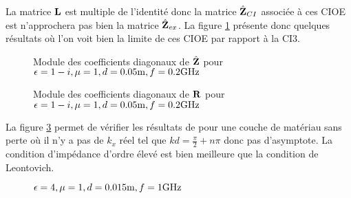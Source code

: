       La matrice \(\mathbf{L}\) est multiple de l'identité donc la matrice \(\hat{\mathbf{Z}}_{CI}\) associée à ces CIOE est n'approchera pas bien la matrice \(\hat{\mathbf{Z}}_{ex}\). La figure \ref{fig:imp_fourier:plan:stupfel:hoibc} présente donc quelques résultats où l'on voit bien la limite de ces CIOE par rapport à la CI3.
      \begin{figure}[!hbt]
        \centering
        
        \caption[CIOE sur empilement de B.~Stupfel p.~1661]{Module des coefficients diagonaux de \(\hat{\mathbf{Z}}\) pour \(\epsilon = 1-i, \mu = 1, d=0.05\text{m}, f=0.2\text{GHz}\)}
        \label{fig:imp_fourier:plan:stupfel:hoibc}
      \end{figure}
      \begin{table}[!hbt]
        \centering

        \caption{Coefficients associés à la figure \ref{fig:imp_fourier:plan:stupfel:hoibc}}
        \label{tab:imp_fourier:plan:stupfel:hoibc}
      \end{table}
      
      \begin{figure}[!hbt]
        \centering
        
        \caption[CIOE sur empilement de B.~Stupfel p.~1661]{Module des coefficients diagonaux de \(\mathbf{R}\) pour \(\epsilon = 1-i, \mu = 1, d=0.05\text{m}, f=0.2\text{GHz}\)}
        \label{fig:reflex_fourier:plan:stupfel:hoibc}
      \end{figure}

      La figure \ref{fig:imp_fourier:plan:hoppe:33:hoibc} permet de vérifier les résultats de \cite[p.~33]{hoppe_impedance_1995} pour une couche de matériau sans perte où il n'y a pas de \(k_x\) réel tel que \(kd=\frac{\pi}{2} + n \pi\) donc pas d'asymptote. La condition d'impédance d'ordre élevé est bien meilleure que la condition de Leontovich.
      \begin{figure}[!hbt]
          \centering
          
          \caption[CIOE sur empilement de Hoppe & Rahmat-Samii p.~33]{\(\epsilon = 4, \mu = 1, d=0.015\text{m}, f=1\text{GHz}\)}
          \label{fig:imp_fourier:plan:hoppe:33:hoibc}
      \end{figure}
      \begin{table}[!hbt]
        \centering
        \caption{Coefficients associés à la figure \ref{fig:imp_fourier:plan:hoppe:33:hoibc}}
        \label{tab:imp_fourier:plan:hoppe:33:hoibc}
      \end{table}

